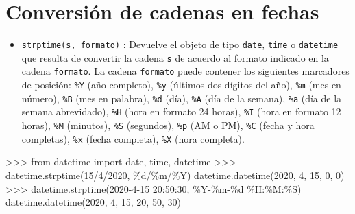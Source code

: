 \documentclass[
  spanish,
  a4paper,
]{scrreport}
\newenvironment{Shaded}{\begin{snugshade}}{\end{snugshade}}
\newcommand{\DecValTok}[1]{\textcolor[rgb]{0.68,0.00,0.00}{#1}}
\newcommand{\ImportTok}[1]{\textcolor[rgb]{0.00,0.46,0.62}{#1}}
\newcommand{\NormalTok}[1]{\textcolor[rgb]{0.00,0.23,0.31}{#1}}
\newcommand{\OperatorTok}[1]{\textcolor[rgb]{0.37,0.37,0.37}{#1}}
\newcommand{\SpecialCharTok}[1]{\textcolor[rgb]{0.37,0.37,0.37}{#1}}
\newcommand{\StringTok}[1]{\textcolor[rgb]{0.13,0.47,0.30}{#1}}
\providecommand{\tightlist}{%
  \setlength{\itemsep}{0pt}\setlength{\parskip}{0pt}}
\begin{document}
\section{Conversión de cadenas en
fechas}\label{conversiuxf3n-de-cadenas-en-fechas}

\begin{itemize}
\tightlist
\item
  \texttt{strptime(s,\ formato)} : Devuelve el objeto de tipo
  \texttt{date}, \texttt{time} o \texttt{datetime} que resulta de
  convertir la cadena \texttt{s} de acuerdo al formato indicado en la
  cadena \texttt{formato}. La cadena \texttt{formato} puede contener los
  siguientes marcadores de posición: \texttt{\%Y} (año completo),
  \texttt{\%y} (últimos dos dígitos del año), \texttt{\%m} (mes en
  número), \texttt{\%B} (mes en palabra), \texttt{\%d} (día),
  \texttt{\%A} (día de la semana), \texttt{\%a} (día de la semana
  abrevidado), \texttt{\%H} (hora en formato 24 horas), \texttt{\%I}
  (hora en formato 12 horas), \texttt{\%M} (minutos), \texttt{\%S}
  (segundos), \texttt{\%p} (AM o PM), \texttt{\%C} (fecha y hora
  completas), \texttt{\%x} (fecha completa), \texttt{\%X} (hora
  completa).
\end{itemize}

\begin{Shaded}
\begin{Highlighting}[]
\OperatorTok{\textgreater{}\textgreater{}\textgreater{}} \ImportTok{from}\NormalTok{ datetime }\ImportTok{import}\NormalTok{ date, time, datetime}
\OperatorTok{\textgreater{}\textgreater{}\textgreater{}}\NormalTok{ datetime.strptime(}\StringTok{\textquotesingle{}15/4/2020\textquotesingle{}}\NormalTok{, }\StringTok{\textquotesingle{}}\SpecialCharTok{\%d}\StringTok{/\%m/\%Y\textquotesingle{}}\NormalTok{)}
\NormalTok{datetime.datetime(}\DecValTok{2020}\NormalTok{, }\DecValTok{4}\NormalTok{, }\DecValTok{15}\NormalTok{, }\DecValTok{0}\NormalTok{, }\DecValTok{0}\NormalTok{)}
\OperatorTok{\textgreater{}\textgreater{}\textgreater{}}\NormalTok{ datetime.strptime(}\StringTok{\textquotesingle{}2020{-}4{-}15 20:50:30\textquotesingle{}}\NormalTok{, }\StringTok{\textquotesingle{}\%Y{-}\%m{-}}\SpecialCharTok{\%d}\StringTok{ \%H:\%M:\%S\textquotesingle{}}\NormalTok{)}
\NormalTok{datetime.datetime(}\DecValTok{2020}\NormalTok{, }\DecValTok{4}\NormalTok{, }\DecValTok{15}\NormalTok{, }\DecValTok{20}\NormalTok{, }\DecValTok{50}\NormalTok{, }\DecValTok{30}\NormalTok{)}
\end{Highlighting}
\end{Shaded}
\end{document}
